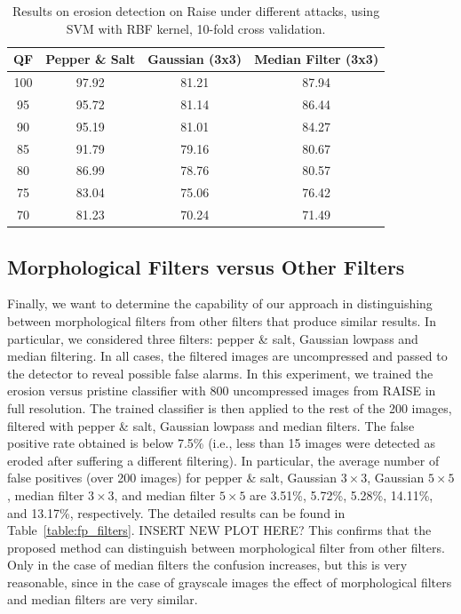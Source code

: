 \documentclass[review]{elsarticle}
\begin{document}
\begin{table}[t!]
	\centering
	\caption{Results on erosion detection on Raise under different attacks, using SVM with RBF kernel, 10-fold cross validation.}
	\label{table:attacks2}
	\begin{tabular}{c|ccc}
		\hline\hline
		\textbf{QF} & \textbf{Pepper \& Salt}&\textbf{Gaussian (3x3)}&\textbf{Median Filter (3x3)}\\
		\hline
		100&97.92&81.21&87.94\\
		95&95.72&81.14&86.44\\
		90&95.19&81.01&84.27\\
		85&91.79&79.16&80.67\\
		80&86.99&78.76&80.57\\
		75&83.04&75.06&76.42\\
		70&81.23&70.24&71.49\\
		\hline\hline	
	\end{tabular}
\end{table}

\subsection{Morphological Filters versus Other Filters }
\label{subsec:results_different_filters}

Finally, we want to determine the capability of our approach in distinguishing between morphological filters from other filters that produce similar results. In particular, we considered three filters: pepper \& salt, Gaussian lowpass and median filtering. In all cases, the filtered images are uncompressed and passed to the detector to reveal possible false alarms. 
In this experiment, we trained the erosion versus pristine classifier with 800 uncompressed images from RAISE in full resolution. The trained classifier is then applied to the rest of the 200 images, filtered with pepper \& salt, Gaussian lowpass and median filters. The false positive rate obtained is below 7.5\% (i.e., less than 15 images were detected as eroded after suffering a different filtering). In particular, the average number of false positives (over 200 images) for pepper \& salt, Gaussian $3 \times 3$, Gaussian $5 \times 5$, median filter $3 \times 3$, and median filter $5 \times 5$ are 3.51\%, 5.72\%, 5.28\%, 14.11\%, and 13.17\%, respectively. The detailed results can be found in Table~\ref{table:fp_filters}. INSERT NEW PLOT HERE? 
This confirms that the proposed method can distinguish between morphological filter from other filters. Only in the case of median filters the confusion increases, but this is very reasonable, since in the case of grayscale images the effect of morphological filters and median filters are very similar.
\end{document}
